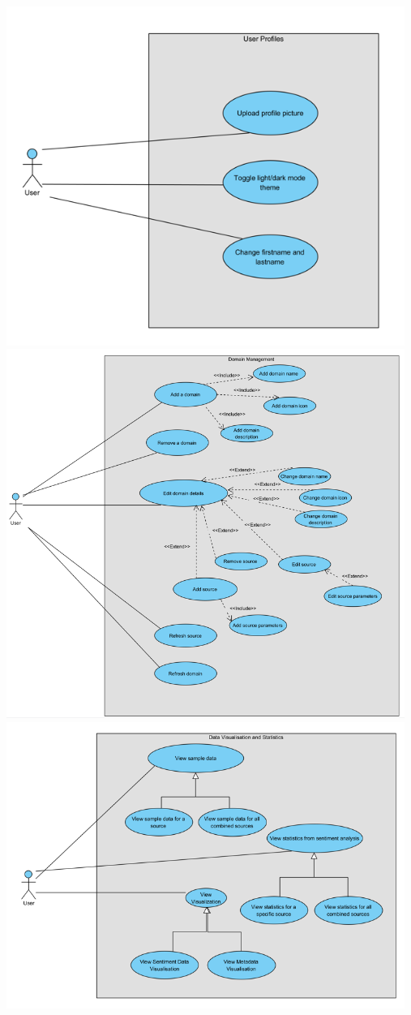 \documentclass[12pt]{article}
\begin{document}
\begin{center}
    \includegraphics[width=13cm]{../../Images/uc1.3.png}
    \includegraphics[width=13cm]{../../Images/uc1.4.png}
    \includegraphics[width=13cm]{../../Images/uc1.5.png}
\end{center}
\end{document}

